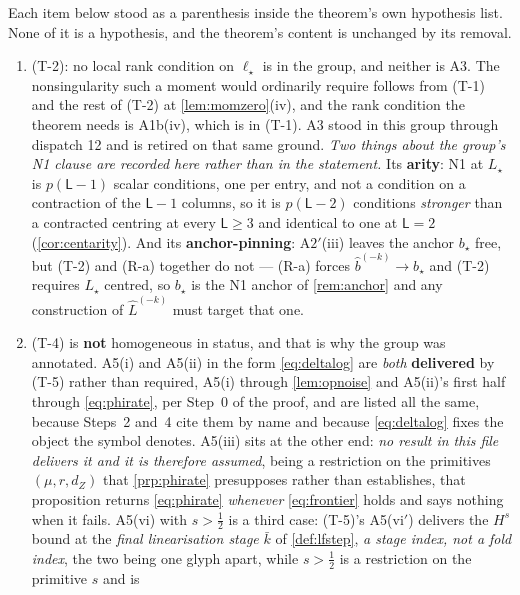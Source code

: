 \begin{remark}\label{rem:rootngroups}
Each item below stood as a parenthesis inside the theorem's own hypothesis list. None of it is a
hypothesis, and the theorem's content is unchanged by its removal.
\begin{enumerate}
\item[(1)] \textup{(T-2)}: no local rank condition on $\ell_\star$ is in the group, and neither is
A3. The nonsingularity such a moment would ordinarily require follows from (T-1) and the rest of (T-2) at
\cref{lem:momzero}\textup{(iv)}, and the rank condition the theorem needs is A1b(iv), which is in (T-1).
A3 stood in this group through dispatch 12 and is retired on that same ground.
\emph{Two things about the group's N1 clause are recorded here rather than in the statement.} Its
\textbf{arity}: N1 at $L_\star$ is $p(\mathsf L-1)$ scalar conditions, one per entry, and not a
condition on a contraction of the $\mathsf L-1$ columns, so it is $p(\mathsf L-2)$ conditions
\emph{stronger} than a contracted centring at every $\mathsf L\ge3$ and identical to one at
$\mathsf L=2$ (\cref{cor:centarity}). And its \textbf{anchor-pinning}: A$2'$(iii) leaves the anchor
$b_\star$ free, but (T-2) and (R-a) together do not --- (R-a) forces $\hat b^{(-k)}\to b_\star$ and
(T-2) requires $L_\star$ centred, so $b_\star$ is the N1 anchor of \cref{rem:anchor} and any
construction of $\hat L^{(-k)}$ must target that one.
\item[(2)] \textup{(T-4)} is \textbf{not} homogeneous in status, and that is why the group was
annotated. A5(i) and A5(ii) in the form \eqref{eq:deltalog} are \emph{both} \textbf{delivered} by (T-5)
rather than required, A5(i) through \cref{lem:opnoise} and A5(ii)'s first half through
\eqref{eq:phirate}, per Step~0 of the proof, and are listed all the same, because Steps~2 and~4 cite
them by name and because \eqref{eq:deltalog} fixes the object the symbol denotes. A5(iii) sits at the
other end: \emph{no result in this file delivers it and it is therefore assumed}, being a restriction on
the primitives $(\mu,r,d_Z)$ that \cref{prp:phirate} presupposes rather than establishes, that
proposition returns \eqref{eq:phirate} \emph{whenever} \eqref{eq:frontier} holds and says nothing when it
fails. A5(vi) with $s>\tfrac12$ is a third case: (T-5)'s A5(vi$'$) delivers the $H^{s}$ bound at the
\emph{final linearisation stage} $\bar k$ of \cref{def:lfstep}, \emph{a stage index, not a fold index},
the two being one glyph apart, while $s>\tfrac12$ is a restriction on the primitive $s$ and is

\end{enumerate}
\end{remark}
